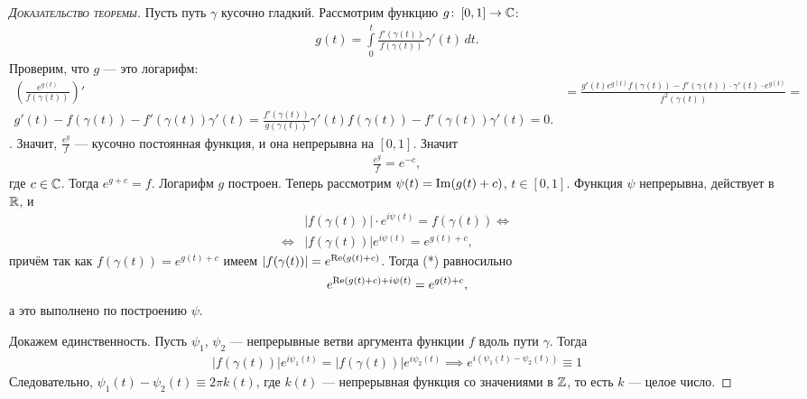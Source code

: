 \documentclass[../complex-analysis.tex]{subfiles}
\begin{document}
\begin{proof}[\normalfont\textsc{Доказательство теоремы}]
 Пусть путь $ \gamma $ кусочно гладкий. Рассмотрим функцию $ g \colon\,[0, 1] \to \mathbb{C} $:
 \begin{align*}
  g(t) = \int\limits_{0}^{t} \frac{f'(\gamma(t))}{f(\gamma(t))} \gamma'(t)\,dt.
 \end{align*} Проверим, что $ g $ --- это логарифм:
 \begin{align*}
  \left(\frac{e^{g(t)}}{f(\gamma(t))}\right)' &= \frac{g'(t)e^{g(t)}f(\gamma(t)) - f'(\gamma(t)) \cdot \gamma'(t) \cdot e^{g(t)}}{f^{2}(\gamma(t))} = \\
  g'(t) - f(\gamma(t)) - f'(\gamma(t))\gamma'(t) = \frac{f'(\gamma(t))}{g(\gamma(t))} \gamma'(t) f(\gamma(t)) - f'(\gamma(t)) \gamma'(t) = 0.
 \end{align*}. Значит, $ \frac{e^{g}}{f} $ --- кусочно постоянная функция, и она непрерывна на $ [0,1] $. Значит
 \begin{align*}
  \frac{e^{g}}{f} = e^{-c}, 
 \end{align*} где $ c \in \mathbb{C} $. Тогда $ e^{g+c} = f $. Логарифм $ g $ построен. Теперь рассмотрим $ \psi(t) = \operatorname{Im} (g(t) + c) $, $ t \in [0,1] $. Функция $ \psi $ непрерывна, действует в $ \mathbb{R} $, и
 \begin{align*}
  &\left| f(\gamma(t)) \right| \cdot e^{i\psi(t)} = f(\gamma(t)) \iff \\
  \iff &\left| f(\gamma(t)) \right|e^{i\psi(t)} = e^{g(t) + c},
 \end{align*} причём так как $ f(\gamma(t)) = e^{g(t)+c} $ имеем $ \left| f(\gamma(t)) \right|  = e^{\operatorname{Re}(g(t)+c)}$. Тогда (*) равносильно
 \begin{align*}
  e^{\operatorname{Re}(g(t)+c) + i\psi(t)} = e^{g(t) + c},
 \end{align*} а это выполнено по построению $ \psi $.

 Докажем единственность. Пусть $ \psi_1 $, $ \psi_2 $ --- непрерывные ветви аргумента функции $ f $ вдоль пути $ \gamma $. Тогда
 \begin{align*}
  \left| f(\gamma(t)) \right|e^{i\psi_1(t)} = \left| f(\gamma(t)) \right|e^{i\psi_2(t)} \implies e^{i(\psi_1(t)-\psi_2(t))}  \equiv 1
 \end{align*} Следовательно, $ \psi_1(t) - \psi_2(t) \equiv 2\pi k(t)$, где $ k(t) $ --- непрерывная функция со значениями в $ \mathbb{Z} $, то есть $ k $ --- целое число.
\end{proof}
\end{document}
